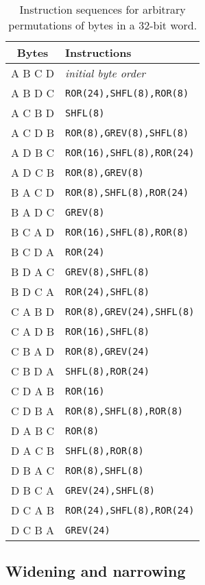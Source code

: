 \begin{table}[h!]
\begin{center}
\begin{tabular}{c|l}
Bytes & Instructions \\
\hline
A B C D & {\it initial byte order} \\
A B D C & {\tt ROR(24),SHFL(8),ROR(8)} \\
A C B D & {\tt SHFL(8)} \\
A C D B & {\tt ROR(8),GREV(8),SHFL(8)} \\
A D B C & {\tt ROR(16),SHFL(8),ROR(24)} \\
A D C B & {\tt ROR(8),GREV(8)} \\
\hline
B A C D & {\tt ROR(8),SHFL(8),ROR(24)} \\
B A D C & {\tt GREV(8)} \\
B C A D & {\tt ROR(16),SHFL(8),ROR(8)} \\
B C D A & {\tt ROR(24)} \\
B D A C & {\tt GREV(8),SHFL(8)} \\
B D C A & {\tt ROR(24),SHFL(8)} \\
\hline
C A B D & {\tt ROR(8),GREV(24),SHFL(8)} \\
C A D B & {\tt ROR(16),SHFL(8)} \\
C B A D & {\tt ROR(8),GREV(24)} \\
C B D A & {\tt SHFL(8),ROR(24)} \\
C D A B & {\tt ROR(16)} \\
C D B A & {\tt ROR(8),SHFL(8),ROR(8)} \\
\hline
D A B C & {\tt ROR(8)} \\
D A C B & {\tt SHFL(8),ROR(8)} \\
D B A C & {\tt ROR(8),SHFL(8)} \\
D B C A & {\tt GREV(24),SHFL(8)} \\
D C A B & {\tt ROR(24),SHFL(8),ROR(24)} \\
D C B A & {\tt GREV(24)} \\
\end{tabular}
\end{center}
\caption{Instruction sequences for arbitrary permutations of bytes in a 32-bit word.}
\label{permbytes}
\end{table}


\subsection{Widening and narrowing}

